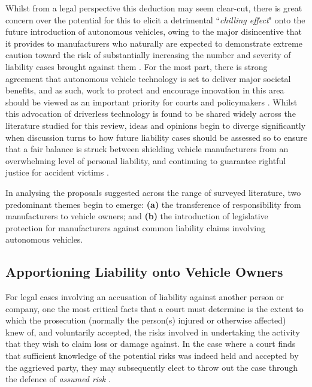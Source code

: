 \documentclass[conference]{IEEEtran}
\begin{document}
Whilst from a legal perspective this deduction may seem clear-cut, there is great concern over the potential for this to elicit a detrimental ``\textit{chilling effect}" \cite{schellekens} onto the future introduction of autonomous vehicles, owing to the major disincentive that it provides to manufacturers who  naturally are expected to demonstrate extreme caution toward the risk of substantially increasing the number and severity of liability cases brought against them \cite{marchant}. For the most part, there is strong agreement that autonomous vehicle technology is set to deliver major societal benefits, and as such,  work to protect and encourage innovation in this area should be viewed as an important priority for courts and policymakers \cite{marchant}. Whilst this advocation of driverless technology is found to be shared widely across the  literature studied for this review, ideas and opinions begin to diverge significantly when discussion turns to how future liability cases should be assessed so to ensure that a fair balance is struck between shielding vehicle manufacturers from an overwhelming level of personal liability, and continuing to guarantee rightful justice for accident victims \cite{schellekens}.

In analysing the proposals suggested across the range of surveyed literature, two predominant themes begin to emerge: \textbf{(a)} the transference of responsibility from manufacturers to vehicle owners; and \textbf{(b)} the introduction of legislative protection for manufacturers against common liability claims involving autonomous vehicles.

\subsection{Apportioning Liability onto Vehicle Owners}

For legal cases involving an accusation of liability against another person or company, one the most critical facts that a court must determine is the extent to which the prosecution (normally the person(s) injured or otherwise affected) knew of, and voluntarily accepted, the risks involved in undertaking the activity that they wish to claim loss or damage against. In the case where a court finds that sufficient knowledge of the potential risks was indeed held and accepted by the aggrieved party, they may subsequently elect to throw out the case through the defence of \textit{assumed risk} \cite{marchant}.
\end{document}
